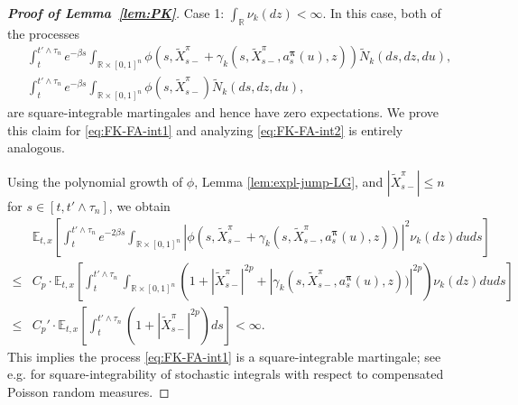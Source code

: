 \documentclass[11pt]{article}
\newcommand{\1}{\mathbbm{1}}
\newcommand{\bpi}{\boldsymbol{\pi}}
\begin{document}
\begin{proof}[\bf Proof of Lemma~\ref{lem:PK}]
	Case 1: $\int_{\mathbb{R}}\nu_k(dz)<\infty$. In this case, both of the processes
	\begin{align}
		&\int_t^{t'\wedge\tau_n} e^{-\beta s}\int_{\mathbb{R}\times[0,1]^n} \phi (s, \tilde X^{\pi}_{s-}+ \gamma_k(s, \tilde X^{\pi}_{s-}, a_s^{\bpi}(u), z)) \widetilde{N}_k(ds, dz, du), \label{eq:FK-FA-int1}\\
		&\int_t^{t'\wedge\tau_n} e^{-\beta s}\int_{\mathbb{R}\times[0,1]^n} \phi (s, \tilde X^{\pi}_{s-}) \widetilde{N}_k(ds, dz, du) \label{eq:FK-FA-int2},
	\end{align}
	are square-integrable martingales and hence have zero expectations. We prove this claim for \eqref{eq:FK-FA-int1} and analyzing \eqref{eq:FK-FA-int2} is entirely analogous.
	
	Using the polynomial growth of $\phi$, Lemma \ref{lem:expl-jump-LG}, and $|\tilde X^{\pi}_{s-}|\leq n$ for $s\in[t, t'\wedge\tau_n]$, we obtain
	\begin{align}
		&\mathbb{E}_{t,x}\left[\int_t^{t'\wedge\tau_n} e^{-2\beta s}\int_{\mathbb{R}\times[0,1]^n} \left|\phi (s, \tilde X^{\pi}_{s-}+ \gamma_k(s, \tilde X^{\pi}_{s-}, a_s^{\bpi}(u), z))\right|^2 \nu_k(dz)duds\right]\\
		\leq& C_p\cdot \mathbb{E}_{t,x}\left[\int_t^{t'\wedge\tau_n} \int_{\mathbb{R}\times[0,1]^n} \left(1 + |\tilde{X}^{\pi}_{s-}|^{2p}  + |\gamma_k(s, \tilde X^{\pi}_{s-}, a_s^{\bpi}(u),z))|^{2p}\right)\nu_k(dz)duds\right]\\
		\leq& C_p'\cdot\mathbb{E}_{t,x}\left[\int_t^{t'\wedge\tau_n} (1+|\tilde X^{\pi}_{s-}|^{2p})ds\right]<\infty.
	\end{align}
	This implies the process \eqref{eq:FK-FA-int1} is a square-integrable martingale; see e.g. \cite[Section 1.9]{rong2006theory}  for square-integrability of stochastic integrals with respect to compensated Poisson random measures.
	

\end{proof}
\end{document}
